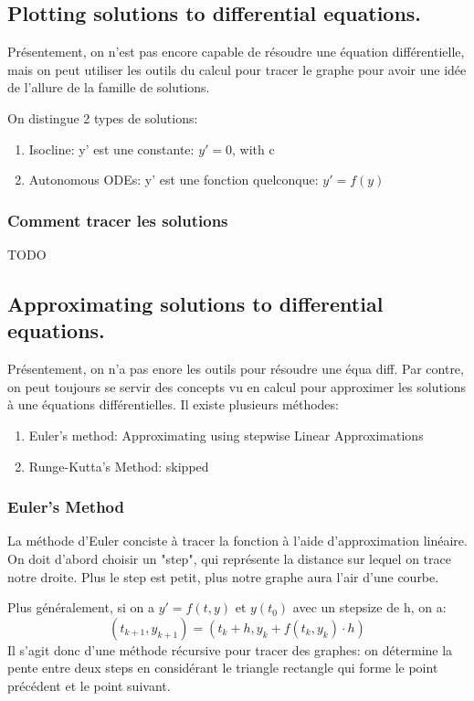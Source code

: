 \documentclass{article}
\begin{document}
\subsection{Plotting solutions to differential equations. }

Présentement, on n'est pas encore capable de résoudre une équation
différentielle, mais on peut utiliser les outils du calcul pour tracer
le graphe pour avoir une idée de l'allure de la famille de solutions.

On distingue 2 types de solutions:
\begin{enumerate}
    \item Isocline: y' est une constante: $ y' = 0$, with c
    \item Autonomous ODEs: y' est une fonction quelconque: $ y' = f(y)$
\end{enumerate}

\subsubsection{Comment tracer les solutions}

TODO

\subsection{Approximating solutions to differential equations. }

Présentement, on n'a pas enore les outils pour résoudre une équa diff.
Par contre, on peut toujours se servir des concepts vu en calcul pour
approximer les solutions à une équations différentielles. Il existe
plusieurs méthodes:
\begin{enumerate}
    \item Euler's method: Approximating using stepwise Linear Approximations
    \item Runge-Kutta's Method: skipped
\end{enumerate}

\subsubsection{Euler's Method}

La méthode d'Euler conciste à tracer la fonction à l'aide d'approximation
linéaire. On doit d'abord choisir un "step", qui représente la distance
sur lequel on trace notre droite. Plus le step est petit, plus notre graphe
aura l'air d'une courbe.

Plus généralement, si on a $ y' = f(t,y)$ et $ y(t_0)$ avec un stepsize
de h, on a:
$$ (t_{k+1}, y_{k+1}) = (t_k + h, y_k + f(t_k, y_k) \cdot h) $$
Il s'agit donc d'une méthode récursive pour tracer des graphes:
on détermine la pente entre deux steps en considérant le triangle
rectangle qui forme le point précédent et le point suivant.
\end{document}
